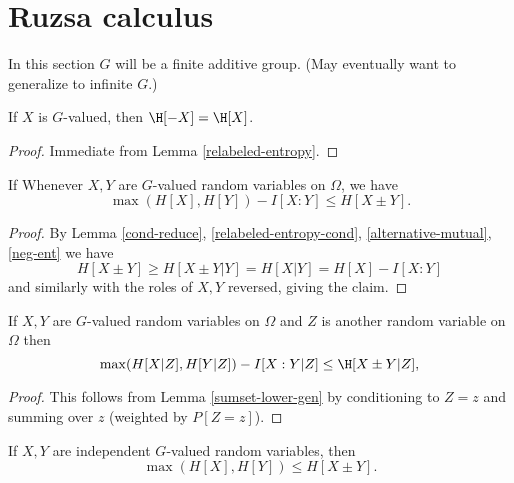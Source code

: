 \chapter{Ruzsa calculus}

In this section $G$ will be a finite additive group.  (May eventually want to generalize to infinite $G$.)

\begin{lemma}\label{neg-ent}  If $X$ is $G$-valued, then $\H[-X]=\H[X]$.
\end{lemma}

\begin{proof} Immediate from Lemma \ref{relabeled-entropy}.
\end{proof}

\begin{lemma}\label{sumset-lower-gen} If
Whenever $X,Y$ are $G$-valued random variables on $\Omega$, we have
$$ \max(H[X], H[Y]) - I[X:Y] \leq H[X \pm Y].$$
\end{lemma}

\begin{proof}   By Lemma \ref{cond-reduce}, \ref{relabeled-entropy-cond}, \ref{alternative-mutual}, \ref{neg-ent} we have
$$
 H[X\pm Y] \geq H[X\pm Y|Y] = H[X|Y]= H[X] - I[X:Y]
$$
and similarly with the roles of $X,Y$ reversed, giving the claim.
\end{proof}

\begin{corollary}\label{sumset-lower-gen-cond} If $X,Y$ are $G$-valued random variables on $\Omega$ and $Z$ is another random variable on $\Omega$ then
\[
  \max(H[X|Z], H[Y|Z]) - I[X:Y|Z] \leq \H[X\pm Y|Z],
\]
\end{corollary}

\begin{proof}  This follows from Lemma \ref{sumset-lower-gen} by conditioning to $Z = z$ and summing over $z$ (weighted by $P[Z=z]$).
\end{proof}

\begin{corollary}\label{sumset-lower} If $X,Y$ are independent $G$-valued random variables, then
$$\max(H[X], H[Y]) \leq H[X\pm Y].
$$
\end{corollary}

